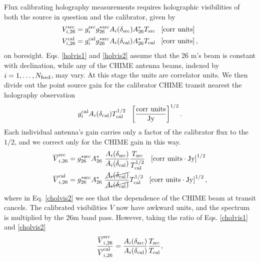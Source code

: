 Flux calibrating holography measurements requires holographic visibilities of both the source in question and the calibrator, given by\begin{subequations}
\begin{align}
V^{\rm src}_{i,{\rm 26}} &= g^{\rm src}_i g^{*{\rm src}}_{\rm 26} A_i(\delta_{\rm src}) A^*_{\rm 26} T_{\rm src} ~~ \left[ {\rm corr~units} \right] \label{holvis1}
\\ 
V^{\rm cal}_{i,{\rm 26}} &= g^{\rm cal}_i g^{*{\rm src}}_{\rm 26} A_i(\delta_{\rm cal}) A^*_{\rm 26} T_{\rm cal} ~~  \left[ {\rm corr~units} \right], \label{holvis2}
\end{align}
\end{subequations}
on boresight. Eqs. \ref{holvis1} and \ref{holvis2} assume that the 26 m's beam is constant with declination, while any of the CHIME antenna beams, indexed by $i=1,\dots,N_{\rm feed}$, may vary. At this stage the units are correlator units. We then divide out the point source gain for the calibrator CHIME transit nearest the holography observation 
\begin{align}
g^{\rm cal}_i A_i(\delta_{\rm cal}) T^{1/2}_{\rm cal} ~~  \left[ \frac{\rm corr~units}{\rm Jy} \right]^{1/2}.
\end{align}
Each individual antenna's gain carries only a factor of the calibrator flux to the $1/2$, and we correct only for the CHIME gain in this way.
\begin{subequations}
\begin{align}
\overline{V}^{\rm src}_{i,{\rm 26}} &= g^{*{\rm src}}_{\rm 26}A^*_{\rm 26}~\frac{A_i(\delta_{\rm src})}{A_i(\delta_{\rm cal})}  \frac{T_{\rm src}}{T_{\rm cal}^{1/2}} ~~ \left[ {\rm corr~units \cdot Jy} \right]^{1/2} \label{cholvis1}
\\ 
\overline{V}^{\rm cal}_{i,{\rm 26}} &=  g^{*{\rm src}}_{\rm 26} A^*_{\rm 26}~\frac{\cancel{A_i(\delta_{\rm cal})}}{\cancel{A_i(\delta_{\rm cal})}} T_{\rm cal}^{1/2} ~~  \left[ {\rm corr~units \cdot Jy} \right]^{1/2},  \label{cholvis2}
\end{align}
\end{subequations}
where in Eq. \ref{cholvis2} we see that the dependence of the CHIME beam at transit cancels. The calibrated visibilities $\overline{V}$ now have awkward units, and the spectrum is multiplied by the 26m band pass. However, taking the ratio of Eqs. \ref{cholvis1} and \ref{cholvis2}
\begin{align}
\frac{\overline{V}^{\rm src}_{i,{\rm 26}}}{\overline{V}^{\rm cal}_{i,{\rm 26}}} = \frac{A_i(\delta_{\rm src})}{A_i(\delta_{\rm cal})} \frac{T_{\rm src}}{T_{\rm cal}},
\end{align}
